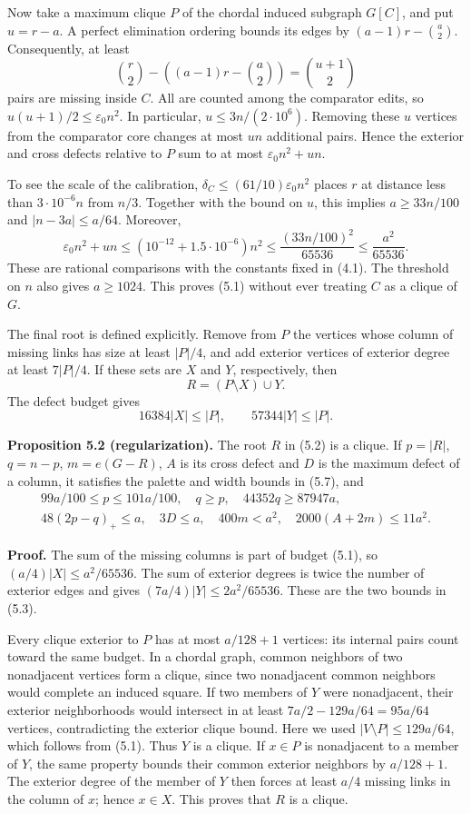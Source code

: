 \documentclass[english,11pt,a4paper]{article}
\begin{document}
Now take a maximum clique \(P\) of the chordal induced subgraph \(G[C]\), and put \(u=r-a\). A perfect elimination ordering bounds its edges by \((a-1)r-\binom a2\). Consequently, at least \[
\binom r2-\left((a-1)r-\binom a2\right)
=\binom{u+1}{2}
\] pairs are missing inside \(C\). All are counted among the comparator edits, so \(u(u+1)/2\le\varepsilon_0n^2\). In particular, \(u\le3n/(2\cdot10^6)\). Removing these \(u\) vertices from the comparator core changes at most \(un\) additional pairs. Hence the exterior and cross defects relative to \(P\) sum to at most \(\varepsilon_0n^2+un\).

To see the scale of the calibration, \(\delta_C\le(61/10)\varepsilon_0n^2\) places \(r\) at distance less than \(3\cdot10^{-6}n\) from \(n/3\). Together with the bound on \(u\), this implies \(a\ge33n/100\) and \(|n-3a|\le a/64\). Moreover, \[
\varepsilon_0n^2+un\le(10^{-12}+1.5\cdot10^{-6})n^2
\le\frac{(33n/100)^2}{65536}\le\frac{a^2}{65536}.
\] These are rational comparisons with the constants fixed in (4.1). The threshold on \(n\) also gives \(a\ge1024\). This proves (5.1) without ever treating \(C\) as a clique of \(G\).

The final root is defined explicitly. Remove from \(P\) the vertices whose column of missing links has size at least \(|P|/4\), and add exterior vertices of exterior degree at least \(7|P|/4\). If these sets are \(X\) and \(Y\), respectively, then \[
R=(P\setminus X)\cup Y.
\tag{5.2}
\] The defect budget gives \[
16384|X|\le |P|,\qquad 57344|Y|\le |P|.
\tag{5.3}
\] 

\textbf{Proposition 5.2 (regularization).} The root \(R\) in (5.2) is a clique. If \(p=|R|\), \(q=n-p\), \(m=e(G-R)\), \(A\) is its cross defect and \(D\) is the maximum defect of a column, it satisfies the palette and width bounds in (5.7), and \[
\begin{gathered}
99a/100\le p\le101a/100,\quad q\ge p,\quad
44352q\ge87947a,\\
48(2p-q)_+\le a,\quad 3D\le a,\quad
400m<a^2,\quad2000(A+2m)\le11a^2.
\end{gathered}
\tag{5.4}
\]

\textbf{Proof.} The sum of the missing columns is part of budget (5.1), so \((a/4)|X|\le a^2/65536\). The sum of exterior degrees is twice the number of exterior edges and gives \((7a/4)|Y|\le2a^2/65536\). These are the two bounds in (5.3).

Every clique exterior to \(P\) has at most \(a/128+1\) vertices: its internal pairs count toward the same budget. In a chordal graph, common neighbors of two nonadjacent vertices form a clique, since two nonadjacent common neighbors would complete an induced square. If two members of \(Y\) were nonadjacent, their exterior neighborhoods would intersect in at least \(7a/2-129a/64=95a/64\) vertices, contradicting the exterior clique bound. Here we used \(|V\setminus P|\le129a/64\), which follows from (5.1). Thus \(Y\) is a clique. If \(x\in P\) is nonadjacent to a member of \(Y\), the same property bounds their common exterior neighbors by \(a/128+1\). The exterior degree of the member of \(Y\) then forces at least \(a/4\) missing links in the column of \(x\); hence \(x\in X\). This proves that \(R\) is a clique.
\end{document}
